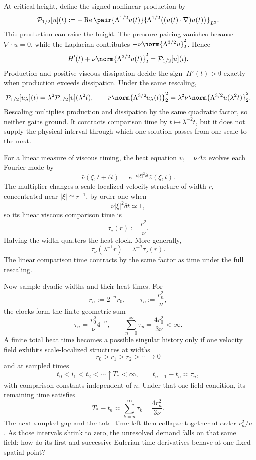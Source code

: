 
At critical height, define the signed nonlinear production by
\[
  \mathcal P_{1/2}[u](t)
  :=
  -\operatorname{Re}
  \pair
    {\Lambda^{1/2}u(t)}
    {\Lambda^{1/2}\bigl((u(t)\cdot\nabla)u(t)\bigr)}_{L^2}.
\]
This production can raise the height. The pressure pairing vanishes because \(\nabla\cdot u=0\), while the Laplacian contributes \(-\nu\norm{\Lambda^{3/2}u}_2^2\). Hence
\[
  H'(t)
  +
  \nu\norm{\Lambda^{3/2}u(t)}_2^2
  =
  \mathcal P_{1/2}[u](t).
\]
Production and positive viscous dissipation decide the sign: \(H'(t)>0\) exactly when production exceeds dissipation. Under the same rescaling,
\[
  \mathcal P_{1/2}[u_\lambda](t)
  =
  \lambda^2\mathcal P_{1/2}[u](\lambda^2t),
  \qquad
  \nu\norm{\Lambda^{3/2}u_\lambda(t)}_2^2
  =
  \lambda^2\nu\norm{\Lambda^{3/2}u(\lambda^2t)}_2^2.
\]
Rescaling multiplies production and dissipation by the same quadratic factor, so neither gains ground. It contracts comparison time by \(t\mapsto\lambda^{-2}t\), but it does not supply the physical interval through which one solution passes from one scale to the next.


For a linear measure of viscous timing, the heat equation \(v_t=\nu\Delta v\) evolves each Fourier mode by
\[
  \widehat v(\xi,t+\delta t)
  =
  e^{-\nu|\xi|^2\delta t}\widehat v(\xi,t).
\]
The multiplier changes a scale-localized velocity structure of width \(r\), concentrated near \(|\xi|\simeq r^{-1}\), by order one when
\[
  \nu|\xi|^2\delta t\simeq1,
\]
so its linear viscous comparison time is
\[
  \tau_\nu(r)
  :=
  \frac{r^2}{\nu}.
\]
Halving the width quarters the heat clock. More generally,
\[
  \tau_\nu(\lambda^{-1}r)
  =
  \lambda^{-2}\tau_\nu(r).
\]
The linear comparison time contracts by the same factor as time under the full \NavierStokes{} rescaling.


Now sample dyadic widths and their heat times. For
\[
  r_n:=2^{-n}r_0,
  \qquad
  \tau_n:=\frac{r_n^2}{\nu},
\]
the clocks form the finite geometric sum
\[
  \tau_n
  =
  \frac{r_0^2}{\nu}4^{-n},
  \qquad
  \sum_{n=0}^{\infty}\tau_n
  =
  \frac{4r_0^2}{3\nu}
  <
  \infty.
\]
A finite total heat time becomes a possible singular history only if one \NavierStokes{} velocity field exhibits scale-localized structures at widths
\[
  r_0>r_1>r_2>\cdots\longrightarrow0
\]
and at sampled times
\[
  t_0<t_1<t_2<\cdots\uparrow T_*<\infty,
  \qquad
  t_{n+1}-t_n\asymp\tau_n,
\]
with comparison constants independent of \(n\). Under that one-field condition, its remaining time satisfies
\[
  T_*-t_n
  \asymp
  \sum_{k=n}^{\infty}\tau_k
  =
  \frac{4r_n^2}{3\nu}.
\]
The next sampled gap and the total time left then collapse together at order \(r_n^2/\nu\). As those intervals shrink to zero, the unresolved demand falls on that same field: how do its first and successive Eulerian time derivatives behave at one fixed spatial point?

